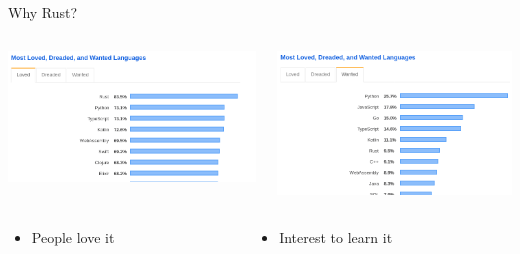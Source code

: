 \documentclass[aspectratio=169]{beamer}
\begin{document}
\begin{frame}[c]{Why Rust?}{}

  \begin{columns}
    \begin{column}{.5\linewidth}
      \includegraphics[width=\linewidth]{figs/screenshots/presentation-20190614-133942}
    \end{column}
    \begin{column}{.5\linewidth}
       {
        \includegraphics[width=\linewidth]{figs/screenshots/presentation-20190614-134442}
        }
    \end{column}
  \end{columns}
  \begin{columns}
    \begin{column}{.3\linewidth}
      \begin{itemize}
      \item People love it
      \end{itemize}
    \end{column}
    \begin{column}{.3\linewidth}
       {
      \begin{itemize}
      \item Interest to learn it
      \end{itemize}
      }
    \end{column}
  \end{columns}
\end{frame}
\end{document}
